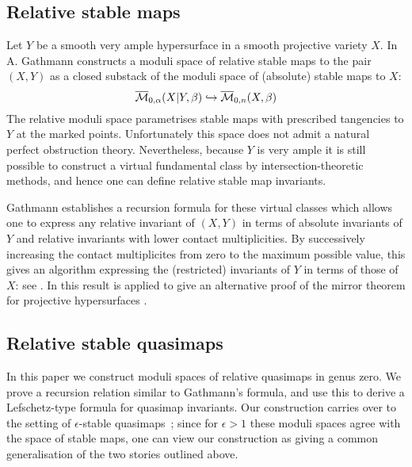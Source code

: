 
\subsection{Relative stable maps}
Let $Y$ be a smooth very ample hypersurface in a smooth projective variety $X$. In \cite{Ga} A. Gathmann constructs a moduli space of relative stable maps to the pair $(X,Y)$ as a closed substack of the moduli space of (absolute) stable maps to $X$:
\begin{equation*} \overline{\mathcal{M}}_{0,\alpha}(X|Y,\beta) \hookrightarrow \overline{\mathcal{M}}_{0,n}(X,\beta) \end{equation*}
The relative moduli space parametrises stable maps with prescribed tangencies to $Y$ at the marked points.  Unfortunately this space does not admit a natural perfect obstruction theory. Nevertheless, because $Y$ is very ample it is still possible to construct a virtual fundamental class by intersection-theoretic methods, and hence one can define relative stable map invariants.

Gathmann establishes a recursion formula for these virtual classes which allows one to express any relative invariant of $(X,Y)$ in terms of absolute invariants of $Y$ and relative invariants with lower contact multiplicities. 
By successively increasing the contact multiplicites from zero to the maximum possible value, this gives an algorithm expressing the (restricted) invariants of $Y$ in terms of those of $X$: see \cite[Corollary 5.7]{Ga}. In \cite{Ga-MF} this result is applied to give an alternative proof of the mirror theorem for projective hypersurfaces \cite{Givental-equivariantGW} \cite{LLY1}.

\subsection{Relative stable quasimaps}
In this paper we construct moduli spaces of relative quasimaps in genus zero. We prove a recursion relation similar to Gathmann's formula, and use this to derive a Lefschetz-type formula for quasimap invariants.
Our construction carries over to the setting of $\epsilon$-stable quasimaps~\cite{CF-K}; since for $\epsilon > 1$ these moduli spaces agree with the space of stable maps, one can view our construction as giving a common generalisation of the two stories outlined above.


